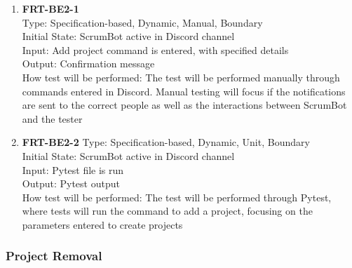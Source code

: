 \documentclass[12pt, titlepage]{article}
\begin{document}
\begin{enumerate}
    \item{\textbf{FRT-BE2-1}}\\
    Type: Specification-based, Dynamic, Manual, Boundary\\
    Initial State: ScrumBot active in Discord channel\\
    Input: Add project command is entered, with specified details\\
    Output: Confirmation message\\
    How test will be performed: The test will be performed manually through commands entered in Discord. Manual testing will focus if the notifications are sent to the correct people as well as the interactions between ScrumBot and the tester\\
    
    \item{\textbf{FRT-BE2-2}}
    Type: Specification-based, Dynamic, Unit, Boundary\\
    Initial State: ScrumBot active in Discord channel\\
    Input: Pytest file is run\\
    Output: Pytest output\\
    How test will be performed: The test will be performed through Pytest, where tests will run the command to add a project, focusing on the parameters entered to create projects\\
\end{enumerate}

\subsubsection{Project Removal}
\end{document}
